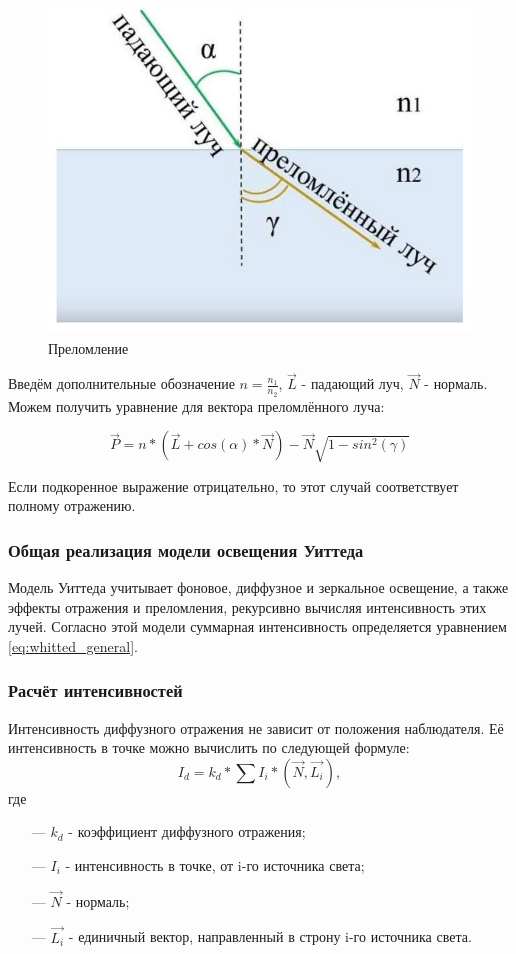 \begin{figure}[htp]
	\centering
	\includegraphics[scale=0.35]{img/refract.png}
	\caption{Преломление}
	\label{fig:refract}
\end{figure}

Введём дополнительные обозначение $n = \frac{n_{1}}{n_{2}}$, $\vec{L}$ - падающий луч, $\vec{N}$ - нормаль. Можем получить уравнение для вектора преломлённого луча:

\[
\vec{P} = n*(\vec{L} + cos(\alpha)*\vec{N}) - \vec{N}\sqrt{1 - sin^2(\gamma)}
\]

Если подкоренное выражение отрицательно, то этот случай соответствует полному отражению.	

\subsubsection{Общая реализация модели освещения Уиттеда}

Модель Уиттеда учитывает фоновое, диффузное и зеркальное освещение, а также эффекты отражения и преломления, рекурсивно вычисляя интенсивность этих лучей. Согласно этой модели суммарная интенсивность определяется уравнением \ref{eq:whitted_general}.

\subsubsection{Расчёт интенсивностей}

Интенсивность диффузного отражения не зависит от положения наблюдателя. Её интенсивность в точке можно вычислить по следующей формуле:
\[
I_{d} = k_{d} * \sum I_{i}*(\vec{N}, \vec{L_{i}}),
\]
где 
\begin{itemize}
	\item[---] $k_{d}$ - коэффициент диффузного отражения;
	\item[---] $I_{i}$ - интенсивность в точке, от i-го источника света;
	\item[---] $\vec{N}$ - нормаль;
	\item[---] $\vec{L_{i}}$ - единичный вектор, направленный в строну i-го источника света.
\end{itemize}

